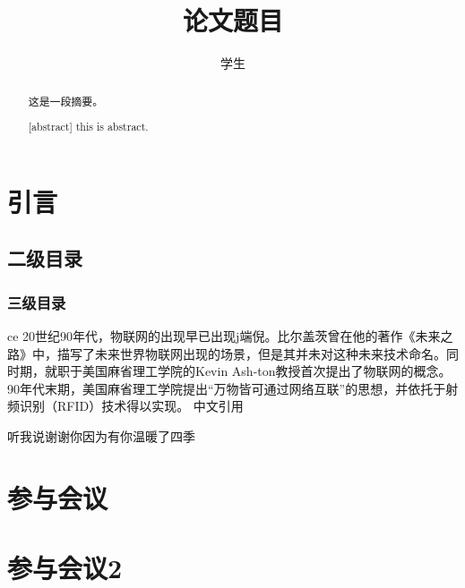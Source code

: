 \documentclass[]{GZUthesis}
\author{学生}
\title{论文题目}
\begin{document}
\maketitle
\page
\begin{abstract}
    这是一段摘要。
\end{abstract}
\newline
{}
\newpage
\begin{abstract}[abstract]
    this is abstract.
\end{abstract}
\newpage
\tableofcontents
\newpage
\content
\section{引言}
\subsection{二级目录}
\subsubsection{三级目录}
ce 
20世纪90年代，物联网的出现早已出现j端倪。比尔盖茨曾在他的著作《未来之路》中，描写了未来世界物联网出现的场景，但是其并未对这种未来技术命名。\cite{gates1995road}同时期，就职于美国麻省理工学院的Kevin Ash-ton教授首次提出了物联网的概念。90年代末期，美国麻省理工学院提出“万物皆可通过网络互联”的思想，并依托于射频识别（RFID）技术得以实现。
中文引用\cite{孙其博2010物联网}


\newpage
\begin{thank}
    听我说谢谢你因为有你温暖了四季
\end{thank}
\newpage\printbibliography
\newpage

\begin{appendices}
    \section{参与会议}

    \section{参与会议2}
\end{appendices}
\promise
\end{document}

